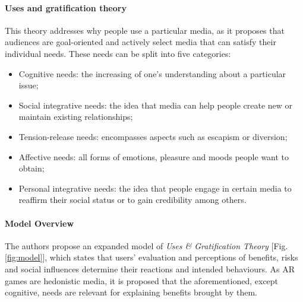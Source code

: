 \documentclass[runningheads]{llncs}
\begin{document}
\paragraph{Uses and gratification theory} This theory addresses why people use a particular media, as it proposes that audiences are goal-oriented and actively select media that can satisfy their individual needs. These needs can be split into five categories:
\begin{itemize}
    \item Cognitive needs: the increasing of one's understanding about a particular issue;
    \item Social integrative needs: the idea that media can help people create new or maintain existing relationships;
    \item Tension-release needs: encompasses aspects such as escapism or diversion;
    \item Affective needs: all forms of emotions, pleasure and moods people want to obtain;
    \item Personal integrative needs: the idea that people engage in certain media to reaffirm their social status or to gain credibility among others. 
\end{itemize}


\paragraph{Model Overview} The authors propose an expanded model of \textit{Uses \& Gratification Theory} [Fig. \ref{fig:model}], which states that users' evaluation and perceptions of benefits, risks and social influences determine their reactions and intended behaviours. As AR games are hedonistic media, it is proposed that the aforementioned, except cognitive, needs are relevant for explaining benefits brought by them.
\end{document}
